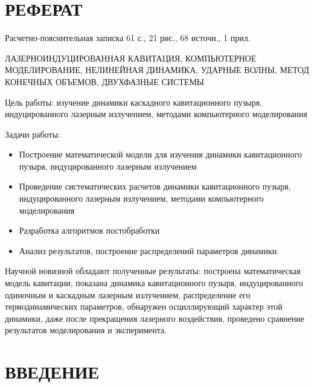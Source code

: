 \setcounter{page}{6}

\newpage
\section*{\fontsize{16pt}{\baselineskip}\selectfont РЕФЕРАТ}

Расчетно-пояснительная записка 61 с., 21 рис., 68 источн., 1 прил.

ЛАЗЕРНОИНДУЦИРОВАННАЯ КАВИТАЦИЯ, КОМПЬЮТЕРНОЕ МОДЕЛИРОВАНИЕ, НЕЛИНЕЙНАЯ ДИНАМИКА, УДАРНЫЕ ВОЛНЫ, МЕТОД КОНЕЧНЫХ ОБЪЕМОВ, ДВУХФАЗНЫЕ СИСТЕМЫ

Цель работы: изучение динамики каскадного кавитационного пузыря, индуцированного лазерным излучением, методами компьютерного моделирования

Задачи работы:
\begin{itemize}
	\item Построение математической модели для изучения динамики кавитационного пузыря, индуцированного лазерным излучением
	\item Проведение систематических расчетов динамики кавитационного пузыря, индуцированного лазерным излучением, методами компьютерного моделирования
	\item Разработка алгоритмов постобработки
	\item Анализ результатов, построение распределений параметров динамики.
\end{itemize}

Научной новизной обладают полученные результаты: построена математическая модель кавитации, показана динамика кавитационного пузыря, индуцированного одиночным и каскадным лазерным излучением, распределение его термодинамических параметров, обнаружен осциллирующий характер этой динамики, даже после прекращения лазерного воздействия, проведено сравнение результатов моделирования и эксперимента.

\renewcommand{\contentsname}{\hfill\bfseries\fontsize{16pt}{\baselineskip}\selectfont СОДЕРЖАНИЕ \hfill}   
\renewcommand{\cftaftertoctitle}{\hfill}

\normalsize

\newpage
\section*{\fontsize{16pt}{\baselineskip}\selectfont ВВЕДЕНИЕ}

